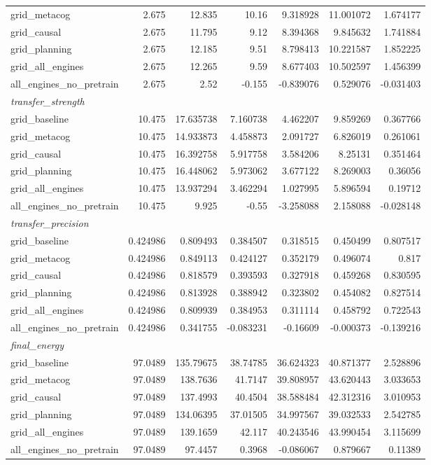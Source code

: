 \begin{tabular}{lrrrrrr}
  grid_metacog & 2.675 & 12.835 & 10.16 & 9.318928 & 11.001072 & 1.674177 \\
  grid_causal & 2.675 & 11.795 & 9.12 & 8.394368 & 9.845632 & 1.741884 \\
  grid_planning & 2.675 & 12.185 & 9.51 & 8.798413 & 10.221587 & 1.852225 \\
  grid_all_engines & 2.675 & 12.265 & 9.59 & 8.677403 & 10.502597 & 1.456399 \\
  all_engines_no_pretrain & 2.675 & 2.52 & -0.155 & -0.839076 & 0.529076 & -0.031403 \\
  \multicolumn{7}{l}{\textit{transfer_strength}} \\
  grid_baseline & 10.475 & 17.635738 & 7.160738 & 4.462207 & 9.859269 & 0.367766 \\
  grid_metacog & 10.475 & 14.933873 & 4.458873 & 2.091727 & 6.826019 & 0.261061 \\
  grid_causal & 10.475 & 16.392758 & 5.917758 & 3.584206 & 8.25131 & 0.351464 \\
  grid_planning & 10.475 & 16.448062 & 5.973062 & 3.677122 & 8.269003 & 0.36056 \\
  grid_all_engines & 10.475 & 13.937294 & 3.462294 & 1.027995 & 5.896594 & 0.19712 \\
  all_engines_no_pretrain & 10.475 & 9.925 & -0.55 & -3.258088 & 2.158088 & -0.028148 \\
  \multicolumn{7}{l}{\textit{transfer_precision}} \\
  grid_baseline & 0.424986 & 0.809493 & 0.384507 & 0.318515 & 0.450499 & 0.807517 \\
  grid_metacog & 0.424986 & 0.849113 & 0.424127 & 0.352179 & 0.496074 & 0.817 \\
  grid_causal & 0.424986 & 0.818579 & 0.393593 & 0.327918 & 0.459268 & 0.830595 \\
  grid_planning & 0.424986 & 0.813928 & 0.388942 & 0.323802 & 0.454082 & 0.827514 \\
  grid_all_engines & 0.424986 & 0.809939 & 0.384953 & 0.311114 & 0.458792 & 0.722543 \\
  all_engines_no_pretrain & 0.424986 & 0.341755 & -0.083231 & -0.16609 & -0.000373 & -0.139216 \\
  \multicolumn{7}{l}{\textit{final_energy}} \\
  grid_baseline & 97.0489 & 135.79675 & 38.74785 & 36.624323 & 40.871377 & 2.528896 \\
  grid_metacog & 97.0489 & 138.7636 & 41.7147 & 39.808957 & 43.620443 & 3.033653 \\
  grid_causal & 97.0489 & 137.4993 & 40.4504 & 38.588484 & 42.312316 & 3.010953 \\
  grid_planning & 97.0489 & 134.06395 & 37.01505 & 34.997567 & 39.032533 & 2.542785 \\
  grid_all_engines & 97.0489 & 139.1659 & 42.117 & 40.243546 & 43.990454 & 3.115699 \\
  all_engines_no_pretrain & 97.0489 & 97.4457 & 0.3968 & -0.086067 & 0.879667 & 0.11389 \\
\bottomrule
\end{tabular}